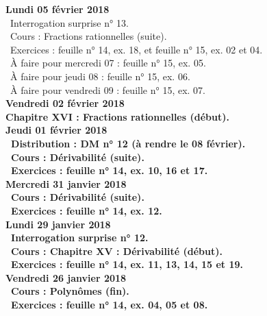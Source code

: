 \documentclass[12pt,a4paper]{article}
\begin{document}
\noindent\textbf{\bf Lundi 05 février 2018} \\
\bu\ Interrogation surprise n° 13.\\
\bu\ Cours : Fractions rationnelles (suite).\\
\bu\ Exercices : feuille n° 14, ex. 18, et feuille n° 15, ex. 02 et 04.\\
\bu\ À faire pour mercredi 07 : feuille n° 15, ex. 05.\\
\bu\ À faire pour jeudi 08 : feuille n° 15, ex. 06.\\
\bu\ À faire pour vendredi 09 : feuille n° 15, ex. 07.\vspace{.4cm}\\

\noindent\textbf{Vendredi 02 février 2018}\\
\bf Chapitre XVI \rm : Fractions rationnelles (début).\vspace{.4cm}\\

\noindent\textbf{Jeudi 01 février 2018}\\
\bu\ Distribution : DM n° 12 (à rendre le 08 février).\\
\bu\ Cours : Dérivabilité (suite).\\
\bu\ Exercices : feuille n° 14, ex. 10, 16 et 17.\vspace{.4cm}\\

\noindent\textbf{Mercredi 31 janvier 2018} \\
\bu\ Cours : Dérivabilité (suite).\\
\bu\ Exercices : feuille n° 14, ex. 12.\vspace{.4cm}\\

\noindent\textbf{Lundi 29 janvier 2018} \\
\bu\ Interrogation surprise n° 12.\\
\bu\ Cours : \bf Chapitre XV \rm : Dérivabilité (début).\\
\bu\ Exercices : feuille n° 14, ex. 11, 13, 14, 15 et 19.\vspace{.4cm}\\

\noindent\textbf{Vendredi 26 janvier 2018}\\
\bu\ Cours : Polynômes (fin).\\
\bu\ Exercices : feuille n° 14, ex. 04, 05 et 08.\vspace{.4cm}\\
\end{document}
